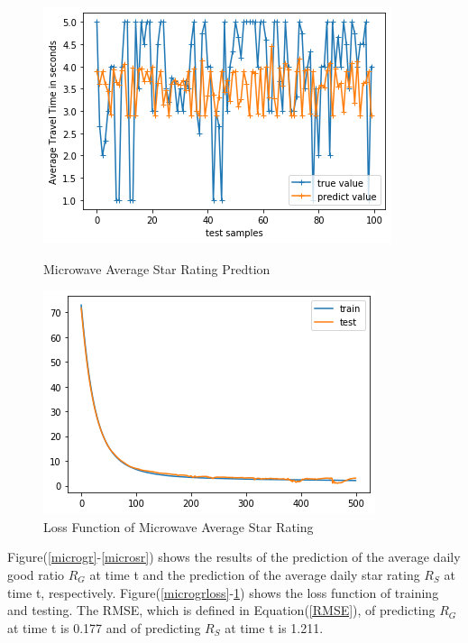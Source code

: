\documentclass[12pt]{article}
\begin{document}
\begin{figure}[!htb]
   \begin{minipage}{0.48\textwidth}
     \centering
     \includegraphics[width=.8\linewidth]{micro_prediction1211.png} %
     \caption{Microwave Average Star Rating Predtion}\label{microsr}
   \end{minipage}\hfill
   \begin{minipage}{0.48\textwidth}
     \centering
     \includegraphics[width=.8\linewidth]{microloss.png}
     \caption{Loss Function of Microwave Average Star Rating}\label{microsrloss}
   \end{minipage}
\end{figure} 

Figure(\ref{microgr}-\ref{microsr}) shows the results of the prediction of the average daily good ratio $R_{G}$ at time t and the prediction of the average daily star rating $R_{S}$ at time t, respectively. Figure(\ref{microgrloss}-\ref{microsrloss}) shows the loss function of training and testing. The RMSE, which is defined in Equation(\ref{RMSE}), of predicting $R_{G}$ at time t is 0.177 and of predicting $R_{S}$ at time t is 1.211. 
\end{document}
